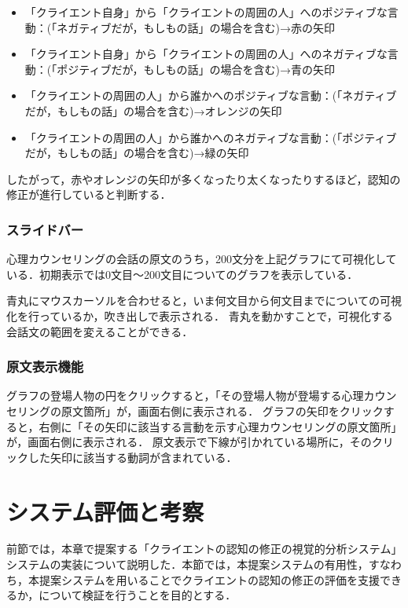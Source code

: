 \documentclass[shuuron]{kuee}
\begin{document}
\begin{itemize}
  \item 「クライエント自身」から「クライエントの周囲の人」へのポジティブな言動：(「ネガティブだが，もしもの話」の場合を含む)→赤の矢印
  \item 「クライエント自身」から「クライエントの周囲の人」へのネガティブな言動：(「ポジティブだが，もしもの話」の場合を含む)→青の矢印
  \item 「クライエントの周囲の人」から誰かへのポジティブな言動：(「ネガティブだが，もしもの話」の場合を含む)→オレンジの矢印
  \item 「クライエントの周囲の人」から誰かへのネガティブな言動：(「ポジティブだが，もしもの話」の場合を含む)→緑の矢印
\end{itemize}

したがって，赤やオレンジの矢印が多くなったり太くなったりするほど，認知の修正が進行していると判断する．

\subsubsection{スライドバー}

心理カウンセリングの会話の原文のうち，200文分を上記グラフにて可視化している．初期表示では0文目〜200文目についてのグラフを表示している．

青丸にマウスカーソルを合わせると，いま何文目から何文目までについての可視化を行っているか，吹き出しで表示される．
青丸を動かすことで，可視化する会話文の範囲を変えることができる．


\subsubsection{原文表示機能}

グラフの登場人物の円をクリックすると，「その登場人物が登場する心理カウンセリングの原文箇所」が，画面右側に表示される．
グラフの矢印をクリックすると，右側に「その矢印に該当する言動を示す心理カウンセリングの原文箇所」が，画面右側に表示される．
原文表示で下線が引かれている場所に，そのクリックした矢印に該当する動詞が含まれている．


\section{システム評価と考察} %

前節では，本章で提案する「クライエントの認知の修正の視覚的分析システム」システムの実装について説明した．本節では，本提案システムの有用性，すなわち，本提案システムを用いることでクライエントの認知の修正の評価を支援できるか，について検証を行うことを目的とする．
\end{document}
